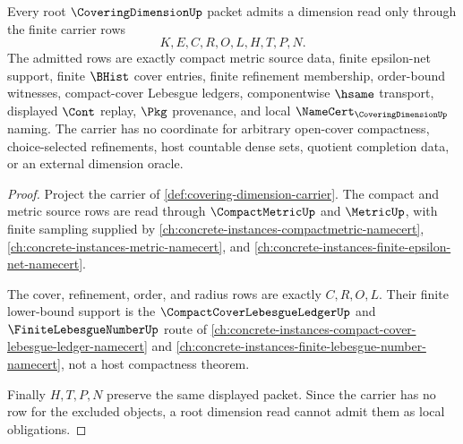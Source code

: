 \begin{theorem}
\label{thm:covering-dimension-root-cover-carrier}
Every root $\CoveringDimensionUp$ packet admits a dimension read only through the finite carrier rows
$$
K,E,C,R,O,L,H,T,P,N .
$$
The admitted rows are exactly compact metric source data, finite epsilon-net support, finite $\BHist$ cover entries, finite refinement membership, order-bound witnesses, compact-cover Lebesgue ledgers, componentwise $\hsame$ transport, displayed $\Cont$ replay, $\Pkg$ provenance, and local $\NameCert_{\CoveringDimensionUp}$ naming. The carrier has no coordinate for arbitrary open-cover compactness, choice-selected refinements, host countable dense sets, quotient completion data, or an external dimension oracle.
\end{theorem}
\begin{proof}
Project the carrier of \autoref{def:covering-dimension-carrier}. The compact and metric source rows are read through $\CompactMetricUp$ and $\MetricUp$, with finite sampling supplied by \autoref{ch:concrete-instances-compactmetric-namecert}, \autoref{ch:concrete-instances-metric-namecert}, and \autoref{ch:concrete-instances-finite-epsilon-net-namecert}.

The cover, refinement, order, and radius rows are exactly $C,R,O,L$. Their finite lower-bound support is the $\CompactCoverLebesgueLedgerUp$ and $\FiniteLebesgueNumberUp$ route of \autoref{ch:concrete-instances-compact-cover-lebesgue-ledger-namecert} and \autoref{ch:concrete-instances-finite-lebesgue-number-namecert}, not a host compactness theorem.

Finally $H,T,P,N$ preserve the same displayed packet. Since the carrier has no row for the excluded objects, a root dimension read cannot admit them as local obligations.
\end{proof}

